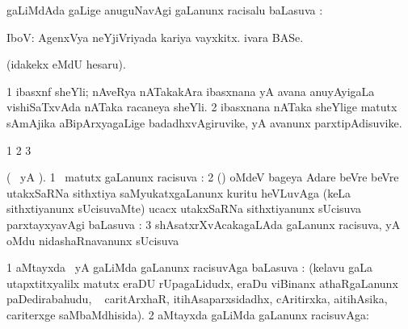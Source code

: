 \bentry
{}
\gl{\uparx}
\bmng
{}gaLiMdAda \gu gaLige anuguNavAgi \kirxvi gaLanunx racisalu baLasuva \uparx:  
\emng
\eentry

\bentry
{}
\gl{\saMkiSx}
\bmng
{} 
\emng
\eentry

\bentry
{}
\gl{\nA}
\bmng
IboV: 
\banum
{} AgenxVya neYjiVriyada kariya vayxkitx. 
 ivara BASe. 
\eanum
\emng
\eentry

\bentry
{}
\gl{\saMkiSx}
\bmng
{} (idakekx  eMdU hesaru). 
\emng
\eentry

\bentry
{}
\gl{\nA}
\bmng
\bnum
\num{1} ibasxnf sheYli; nAveRya nATakakAra ibasxnana yA avana anuyAyigaLa vishiSaTxvAda nATaka racaneya sheYli. 
\num{2} ibasxnana nATaka sheYlige matutx sAmAjika aBipArxyagaLige badadhxvAgiruvike, yA avanunx parxtipAdisuvike. 
\enum
\emng
\eentry

\bentry
{}
\gl{\saMkiSx}
\bmng
{} 
\emng
\eentry

\bentry
{}
\gl{\saMkiSx}
\bmng
\bnum
\num{1}  
\num{2}  
\num{3}  
\enum
\emng
\eentry

\bentry
{}
\gl{\uparx}
\bmng
(\pArxparx\  yA ). 
\bnum
\num{1} \gu\ matutx \nA gaLanunx racisuva \uparx:  
\num{2} (\ravi) oMdeV bageya Adare beVre beVre utakxSaRNa sithxtiya saMyukatxgaLanunx kuritu heVLuvAga (keLa sithxtiyanunx  sUcisuvaMte) ucacx utakxSaRNa sithxtiyanunx sUcisuva parxtayxyavAgi baLasuva \uparx:  
\num{3} shAsatxrXvAcakagaLAda \nA gaLanunx racisuva, yA oMdu nidashaRnavanunx sUcisuva \uparx\  
\enum
\emng
\eentry


\bentry
{}
\gl{\uparx}
\bmng
\bnum
\num{1}  aMtayxda \nA\ yA \gu gaLiMda \gu gaLanunx racisuvAga baLasuva \uparx:  (kelavu \gu gaLa utapxtitxyalilx  matutx  eraDU rUpagaLidudx, eraDu viBinanx athaRgaLanunx paDedirabahudu, \udA\  caritArxhaR, itihAsaparxsidadhx,  cAritirxka, aitihAsika, cariterxge saMbaMdhisida). 
\num{2}  aMtayxda \nA gaLiMda \gu gaLanunx racisuvAga:  
\enum
\emng
\eentry

